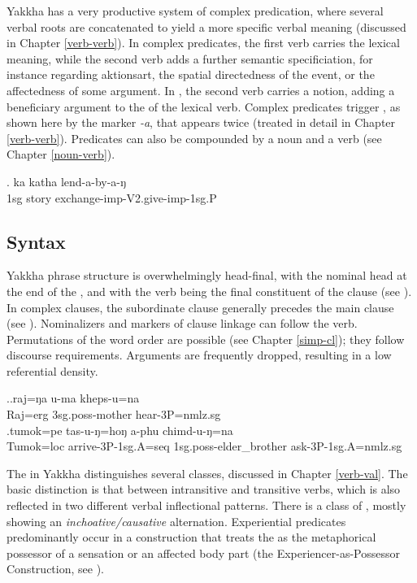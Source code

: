 Yakkha has a very productive system of complex predication, where several verbal roots are concatenated to yield a more specific verbal meaning (discussed in Chapter \ref{verb-verb}). In complex predicates, the first verb carries the lexical meaning, while the second verb adds a further semantic specificiation, for instance regarding aktionsart, the spatial directedness of the event, or the affectedness of some argument. In \Next, the second verb carries a  notion, adding a beneficiary argument to the  of the lexical verb. Complex predicates trigger , as shown here by the  marker \emph{-a}, that appears twice (treated in detail in Chapter \ref{verb-verb}). Predicates can also be compounded by a noun and a verb  (see Chapter \ref{noun-verb}).
 	
	\exg. ka katha lend-a-by-a-ŋ\\
	{\sc 1sg} story  exchange{\sc -imp-V2.give-imp-1sg.P}\\



\subsection{Syntax}

Yakkha phrase structure is overwhelmingly  head-final, with the nominal head at the end of the , and with the verb being the final constituent of the clause (see \Next[a]). In complex clauses, the subordinate clause generally precedes the main clause (see \Next[b]). Nominalizers and markers of clause linkage can follow the verb. Permutations of the word order are possible (see Chapter \ref{simp-cl}); they follow discourse requirements. Arguments are frequently dropped, resulting in a low referential density. 

\ex.\ag.raj=ŋa u-ma  kheps-u=na\\
Raj{\sc =erg} {\sc 3sg.poss-}mother hear{\sc [pst]-3P=nmlz.sg}\\
\bg.tumok=pe tas-u-ŋ=hoŋ a-phu chimd-u-ŋ=na\\
Tumok{\sc =loc} arrive{\sc [pst]-3P-1sg.A=seq} {\sc 1sg.poss-}elder\_brother ask{\sc [pst]-3P-1sg.A=nmlz.sg}\\

The  in Yakkha distinguishes several  classes, discussed in Chapter \ref{verb-val}. The basic distinction is that between intransitive and transitive verbs, which is also reflected in two different verbal inflectional patterns. There is a class of , mostly showing an \emph{inchoative/causative} alternation. Experiential predicates predominantly occur in a construction that treats the  as the metaphorical possessor of a sensation or an affected body part (the Experiencer-as-Possessor Construction, see \Next).

